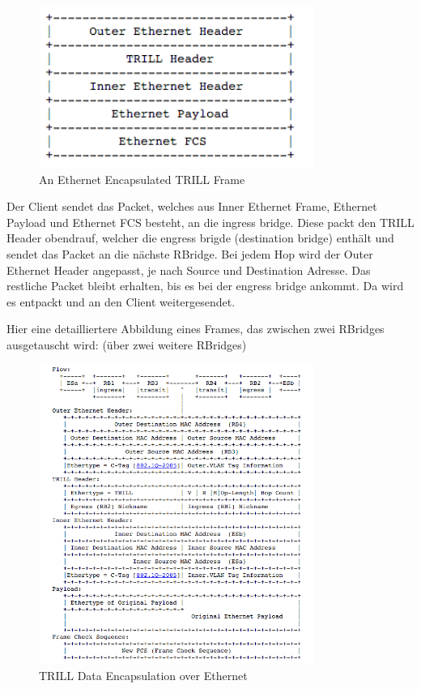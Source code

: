 \documentclass[a4,12pt]{scrartcl}
\begin{document}
\begin{figure} [H]
	\begin{center}
	\includegraphics[width=0.80\textwidth]{./pictures/trill_encapsulation.png}
	\caption{An Ethernet Encapsulated TRILL Frame}
	\label{x}
	\end{center}
\end{figure}

\noindent Der Client sendet das Packet, welches aus Inner Ethernet Frame, Ethernet Payload und Ethernet FCS besteht, an die ingress bridge. Diese packt den TRILL Header obendrauf, welcher die engress brigde (destination bridge) enthält und sendet das Packet an die nächste RBridge. Bei jedem Hop wird der Outer Ethernet Header angepasst, je nach Source und Destination Adresse. Das restliche Packet bleibt erhalten, bis es bei der engress bridge ankommt. Da wird es entpackt und an den Client weitergesendet. 
\newpage

\noindent Hier eine detailliertere Abbildung eines Frames, das zwischen zwei RBridges ausgetauscht wird: (über zwei weitere RBridges) 
\begin{figure} [H]
	\begin{center}
	\includegraphics[width=0.80\textwidth]{./pictures/trill_frame_flow.png}
	\caption{TRILL Data Encapsulation over Ethernet}
	\label{x}
	\end{center}
\end{figure}
\end{document}
